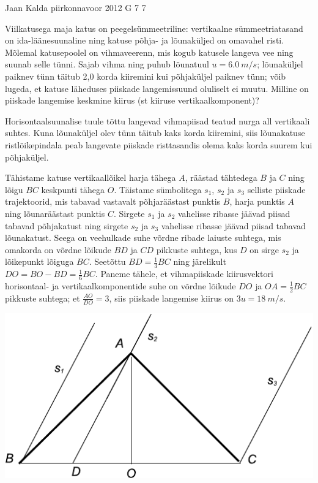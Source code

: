 {Jaan Kalda} %
{piirkonnavoor} %
{2012} %
{G 7} %
{7} %
{
\ifStatement
Viilkatusega maja katus on peegelsümmeetriline: vertikaalne sümmeetriatasand on
ida-läänesuunaline ning katuse
põhja- ja lõunaküljed on omavahel risti. Mõlemal katusepoolel on vihmaveerenn,
mis kogub katusele langeva vee ning suunab selle tünni.
Sajab vihma ning puhub lõunatuul $u= \SI{6,0}{m/s}$; lõunaküljel paiknev tünn
täitub 2,0 korda kiiremini kui põhjaküljel paiknev tünn; võib
lugeda, et katuse läheduses piiskade langemissuund oluliselt ei muutu.
Milline on piiskade langemise keskmine kiirus (st kiiruse vertikaalkomponent)?
\fi


\ifHint
Horisontaalsuunalise tuule tõttu langevad vihmapiisad teatud nurga all vertikaali suhtes. Kuna lõunaküljel olev tünn täitub kaks korda kiiremini, siis lõunakatuse ristlõikepindala peab langevate piiskade risttasandis olema kaks korda suurem kui põhjaküljel.
\fi


\ifSolution
Tähistame katuse vertikaallõikel harja tähega $A$, räästad tähtedega $B$ ja $C$ ning lõigu $BC$ keskpunti tähega $O$. 
Täistame sümbolitega $s_1$, $s_2$ ja $s_3$ selliste piiskade trajektoorid, mis tabavad vastavalt põhjaräästast punktis $B$, harja punktis $A$ ning  lõunaräästast punktis $C$. Sirgete $s_1$ ja $s_2$ vahelisse ribasse jäävad piisad tabavad põhjakatust ning sirgete $s_2$ ja $s_3$ vahelisse ribasse jäävad 
piisad tabavad lõunakatust. Seega on veehulkade suhe võrdne ribade laiuste suhtega, mis omakorda on võrdne lõikude $BD$ ja $CD$ pikkuste suhtega, kus $D$ on sirge $s_2$ ja lõikepunkt lõiguga $BC$. Seetõttu $BD=\frac 13 BC$ ning järelikult $DO=BO-BD=\frac 16 BC$. Paneme tähele, et vihmapiiskade 
kiirusvektori horisontaal- ja vertikaalkomponentide suhe on võrdne lõikude $DO$ ja $OA=\frac 12 BC$ pikkuste suhtega; et $\frac {AO}{DO}=3$, siis piiskade 
langemise kiirus on $3u=\SI{18}{m/s}$.

\begin{center}
\includegraphics[width=0.5\linewidth]{2012-v2g-07-katus}
\end{center}
\fi


}
